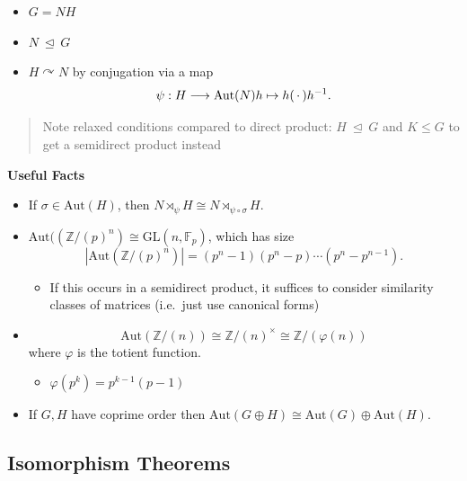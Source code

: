 \begin{itemize}
\item
  \(G = NH\)
\item
  \(N {~\trianglelefteq~}G\)
\item
  \(H \curvearrowright N\) by conjugation via a map \[  
  \psi: H \longrightarrow{\mathrm{Aut}}(N) \\
  h \mapsto h({\,\cdot\,})h^{-1}
  .\]
\end{itemize}

\begin{quote}
Note relaxed conditions compared to direct product:
\(H{~\trianglelefteq~}G\) and \(K\leq G\) to get a semidirect product
instead
\end{quote}

\textbf{Useful Facts}

\begin{itemize}
\item
  If \(\sigma \in {\mathrm{Aut}}(H)\), then
  \(N \rtimes_\psi H \cong N \rtimes_{\psi \circ \sigma} H\).
\item
  \({\mathrm{Aut}}(({\mathbb{Z}}/(p)^n) \cong \mathrm{GL}(n, {\mathbb{F}}_p)\),
  which has size \[  
  {\left\lvert {{\mathrm{Aut}}({\mathbb{Z}}/(p)^n)} \right\rvert} = (p^n-1)(p^n-p)\cdots(p^n-p^{n-1})
  .\]

  \begin{itemize}
  \tightlist
  \item
    If this occurs in a semidirect product, it suffices to consider
    similarity classes of matrices (i.e.~just use canonical forms)
  \end{itemize}
\item
  \[ {\mathrm{Aut}}({\mathbb{Z}}/(n)) \cong {\mathbb{Z}}/(n)^{\times}\cong {\mathbb{Z}}/({\varphi(n)})\]
  where \(\varphi\) is the totient function.

  \begin{itemize}
  \tightlist
  \item
    \(\varphi(p^k) = p^{k-1}(p-1)\)
  \end{itemize}
\item
  If \(G, H\) have coprime order then
  \({\mathrm{Aut}}(G\oplus H) \cong {\mathrm{Aut}}(G) \oplus {\mathrm{Aut}}(H)\).
\end{itemize}

\hypertarget{isomorphism-theorems}{%
\subsection{Isomorphism Theorems}\label{isomorphism-theorems}}

